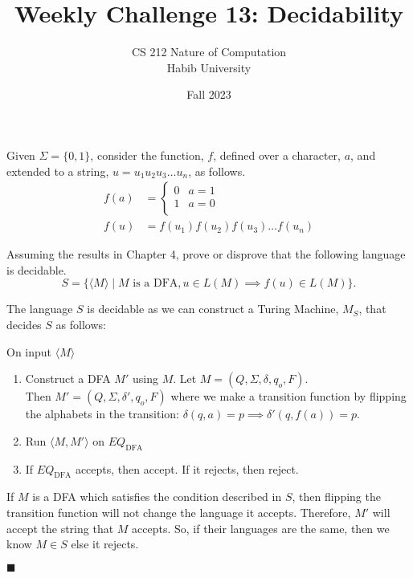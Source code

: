 \documentclass[a4paper]{exam}
\title{Weekly Challenge 13: Decidability}
\author{CS 212 Nature of Computation\\Habib University}
\date{Fall 2023}
\begin{document}
\maketitle

\begin{questions}


  Given $\Sigma=\{0,1\}$, consider the function, $f$, defined over a character, $a$, and extended to a string, $u=u_1u_2u_3\ldots u_n$, as follows.
  \begin{align*}
    f(a) & =
    \begin{cases}
      0 & a = 1 \\
      1 & a = 0 \\
    \end{cases}                             \\
    f(u) & = f(u_1)f(u_2)f(u_3)\ldots f(u_n)
  \end{align*}

  Assuming the results in Chapter 4, prove or disprove that the following language is decidable.
  \[
    S = \{\langle M\rangle \mid M\text{ is a DFA},  u\in L(M) \implies f(u)\in L(M)\}.
  \]

  \begin{solution}
    The language $S$ is decidable as we can construct a Turing Machine, $ M_S $, that decides $S$ as follows:

    On input $ \langle M \rangle $ \vspace*{-2mm}
    \begin{enumerate}
      \item Construct a DFA $M'$ using $M$. Let $M = (Q, \Sigma, \delta, q_o, F)$. \\ Then $ M' = (Q, \Sigma, \delta', q_o, F) $ where we make a transition function by flipping the alphabets in the transition: $ \delta(q, a) = p \implies \delta'(q, f(a)) = p $. \vspace*{-2mm}
      \item Run $ \langle M, M' \rangle $ on $ EQ_\text{DFA} $ \vspace*{-2mm}
      \item If $ EQ_\text{DFA} $ accepts, then accept. If it rejects, then reject.
    \end{enumerate}
    If $M$ is a DFA which satisfies the condition described in $S$, then flipping the transition function will not change the language it accepts. Therefore, $M'$ will accept the string that $M$ accepts. So, if their languages are the same, then we know $ M \in S $ else it rejects. 
    \vspace*{-8mm}
    \begin{flushright}
      $ \blacksquare $
    \end{flushright}

  \end{solution}

\end{questions}
\end{document}
